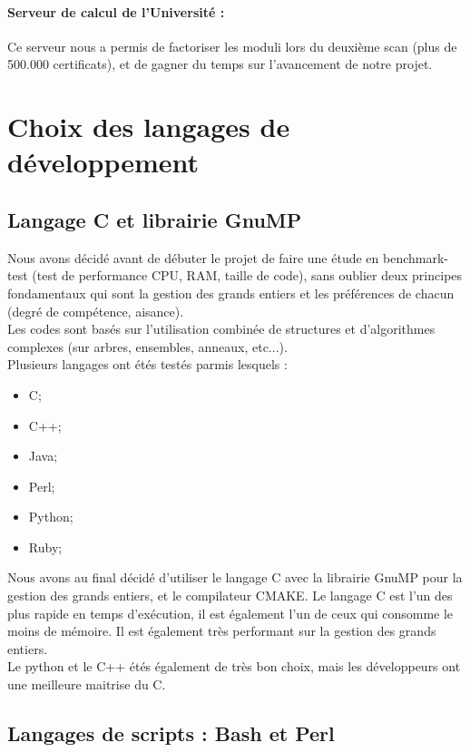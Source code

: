 \paragraph{Serveur de calcul de l'Université :} Ce serveur nous a permis de factoriser les moduli lors du deuxième scan (plus de 500.000 certificats), et de gagner du temps sur l'avancement de notre projet.

\section{Choix des langages de développement}

\subsection{Langage C et librairie GnuMP}

Nous avons décidé avant de débuter le projet de faire une étude en benchmark-test \cite{chooseprogram2013} \cite{marceau2009program} \cite{udemypng} (test de performance CPU, RAM, taille de code), sans oublier deux principes fondamentaux qui sont la gestion des grands entiers et les préférences de chacun (degré de compétence, aisance).\\
Les codes sont basés sur l'utilisation combinée de structures et d'algorithmes complexes (sur arbres, ensembles, anneaux, etc...).\\

Plusieurs langages ont étés testés parmis lesquels :
\begin{itemize}
\item C;
\item C++;
\item Java;
\item Perl;
\item Python;
\item Ruby;\\
\end{itemize}

Nous avons au final décidé d'utiliser le langage C avec la librairie GnuMP \cite{gmplib} pour la gestion des grands entiers, et le compilateur CMAKE.
Le langage C est l'un des plus rapide en temps d'exécution, il est également l'un de ceux qui consomme le moins de mémoire. Il est également très performant sur la gestion des grands entiers.\\
Le python et le C++ étés également de très bon choix, mais les développeurs ont une meilleure maitrise du C.

\subsection{Langages de scripts : Bash et Perl}

